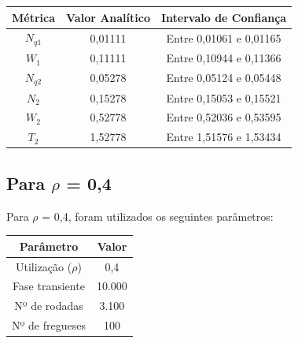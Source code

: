 \documentclass[a4paper,12pt]{report}
\begin{document}
\vspace{-5mm}
\begin{center}
\begin{tabular}{ c c c }
  \hline
  \textbf{Métrica} & \textbf{Valor Analítico} & \textbf{Intervalo de Confiança} \\
  \hline
  $N_{q1}$ & 0,01111 & Entre 0,01061 e 0,01165 \\
  $W_1$    & 0,11111 & Entre 0,10944 e 0,11366 \\
  $N_{q2}$ & 0,05278 & Entre 0,05124 e 0,05448 \\
  $N_2$    & 0,15278 & Entre 0,15053 e 0,15521 \\
  $W_2$    & 0,52778 & Entre 0,52036 e 0,53595 \\
  $T_2$    & 1,52778 & Entre 1,51576 e 1,53434 \\
  \hline
\end{tabular}
\end{center}

\subsection{Para $\rho$ = 0,4}
Para $\rho$ = 0,4, foram utilizados os seguintes parâmetros:

\vspace{-5mm}

\begin{center}
\begin{tabular}{ c c }
  \hline
  \textbf{Parâmetro} & \textbf{Valor}\\
  \hline
  Utilização ($\rho$) & 0,4\\
  Fase transiente & 10.000\\
  Nº de rodadas & 3.100\\
  Nº de fregueses & 100\\
  \hline
\end{tabular}
\end{center}
\end{document}

